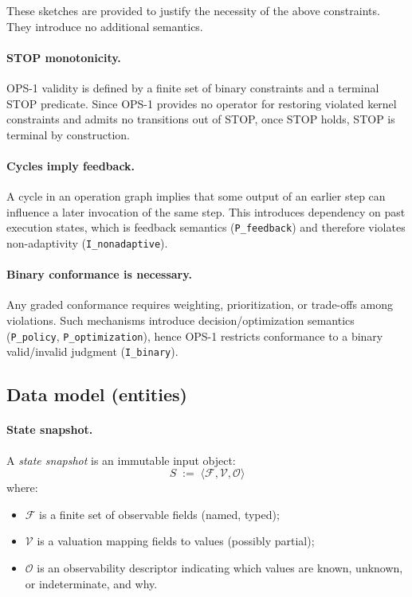 These sketches are provided to justify the necessity of the above constraints.
They introduce no additional semantics.

\paragraph{STOP monotonicity.}
OPS-1 validity is defined by a finite set of binary constraints and a terminal
STOP predicate. Since OPS-1 provides no operator for restoring violated kernel
constraints and admits no transitions out of STOP, once STOP holds, STOP is
terminal by construction.

\paragraph{Cycles imply feedback.}
A cycle in an operation graph implies that some output of an earlier step can
influence a later invocation of the same step. This introduces dependency on
past execution states, which is feedback semantics (\texttt{P\_feedback}) and
therefore violates non-adaptivity (\texttt{I\_nonadaptive}).

\paragraph{Binary conformance is necessary.}
Any graded conformance requires weighting, prioritization, or trade-offs among
violations. Such mechanisms introduce decision/optimization semantics
(\texttt{P\_policy}, \texttt{P\_optimization}), hence OPS-1 restricts conformance
to a binary valid/invalid judgment (\texttt{I\_binary}).

\subsection{Data model (entities)}

\paragraph{State snapshot.}
A \emph{state snapshot} is an immutable input object:
\[
S \;:=\; \langle \mathcal{F}, \mathcal{V}, \mathcal{O} \rangle
\]
where:
\begin{itemize}
  \item $\mathcal{F}$ is a finite set of observable fields (named, typed);
  \item $\mathcal{V}$ is a valuation mapping fields to values (possibly partial);
  \item $\mathcal{O}$ is an observability descriptor indicating which values are
        known, unknown, or indeterminate, and why.
\end{itemize}


